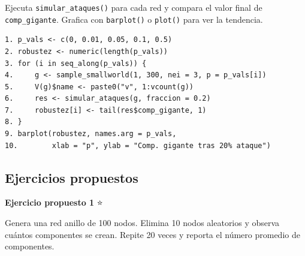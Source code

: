 \documentclass[
  letterpaper,
  DIV=11,
  numbers=noendperiod]{scrreprt}
\begin{document}
\begin{tcolorbox}[enhanced jigsaw, toprule=.15mm, colframe=quarto-callout-note-color-frame, coltitle=black, titlerule=0mm, colback=white, breakable, leftrule=.75mm, arc=.35mm, bottomtitle=1mm, toptitle=1mm, rightrule=.15mm, bottomrule=.15mm, left=2mm, title=\textcolor{quarto-callout-note-color}{\faInfo}\hspace{0.5em}{💡 Pista 2}, colbacktitle=quarto-callout-note-color!10!white, opacityback=0, opacitybacktitle=0.6]

Ejecuta \texttt{simular\_ataques()} para cada red y compara el valor
final de \texttt{comp\_gigante}. Grafica con \texttt{barplot()} o
\texttt{plot()} para ver la tendencia.

\end{tcolorbox}

\begin{tcolorbox}[enhanced jigsaw, toprule=.15mm, colframe=quarto-callout-note-color-frame, coltitle=black, titlerule=0mm, colback=white, breakable, leftrule=.75mm, arc=.35mm, bottomtitle=1mm, toptitle=1mm, rightrule=.15mm, bottomrule=.15mm, left=2mm, title=\textcolor{quarto-callout-note-color}{\faInfo}\hspace{0.5em}{💡 Pista 3 --- Pseudocódigo}, colbacktitle=quarto-callout-note-color!10!white, opacityback=0, opacitybacktitle=0.6]

\begin{verbatim}
1. p_vals <- c(0, 0.01, 0.05, 0.1, 0.5)
2. robustez <- numeric(length(p_vals))
3. for (i in seq_along(p_vals)) {
4.     g <- sample_smallworld(1, 300, nei = 3, p = p_vals[i])
5.     V(g)$name <- paste0("v", 1:vcount(g))
6.     res <- simular_ataques(g, fraccion = 0.2)
7.     robustez[i] <- tail(res$comp_gigante, 1)
8. }
9. barplot(robustez, names.arg = p_vals,
10.        xlab = "p", ylab = "Comp. gigante tras 20% ataque")
\end{verbatim}

\end{tcolorbox}

\subsection*{Ejercicios propuestos}\label{ejercicios-propuestos-4}

\textbf{Ejercicio propuesto 1} ⭐

Genera una red anillo de 100 nodos. Elimina 10 nodos aleatorios y
observa cuántos componentes se crean. Repite 20 veces y reporta el
número promedio de componentes.
\end{document}
